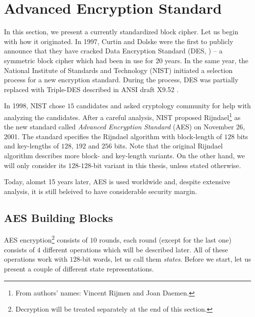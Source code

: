 \section{Advanced Encryption Standard}
\label{sec:aes}

In this section, we present a currently standardized block cipher. Let us begin with how it originated. In 1997, Curtin and Dolske were the first to publicly announce \cite{curtin1998brute} that they have cracked Data Encryption Standard (DES, \cite{fips1977des}) -- a symmetric block cipher which had been in use for $20$ years. In the same year, the National Institute of Standards and Technology (NIST) initiated a selection process for a new encryption standard. During the process, DES was partially replaced with Triple-DES described in ANSI draft X9.52 \cite{americantripple}.

In 1998, NIST chose $15$ candidates and asked cryptology community for help with analyzing the candidates. After a careful analysis, NIST proposed Rijndael\footnote{From authors' names: Vincent Rijmen and Joan Daemen.} \cite{daemen1999aes} as the new standard called {\em Advanced Encryption Standard} (AES) \cite{fips2001aes} on November 26, 2001. The standard specifies the Rijndael algorithm with block-length of $128$ bits and key-lengths of $128$, $192$ and $256$ bits. Note that the original Rijndael algorithm \cite{daemen2013rijndael} describes more block- and key-length variants. On the other hand, we will only consider its $128$-$128$-bit variant in this thesis, unless stated otherwise.

Today, alomst 15 years later, AES is used worldwide and, despite extensive analysis, it is still beleived to have considerable security margin.



\subsection{AES Building Blocks}

AES encryption\footnote{Decryption will be treated separately at the end of this section.} consists of $10$ rounds, each round (except for the last one) consists of $4$ different operations which will be described later. All of these operations work with $128$-bit words, let us call them {\em states}. Before we start, let us present a couple of different state representations. 

